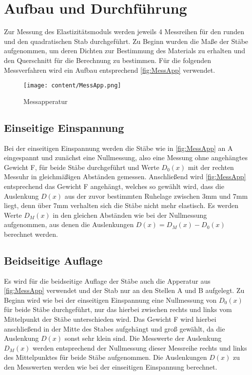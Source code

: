 \section{Aufbau und Durchführung}
\label{sec:Durchführung}
Zur Messung des Elastizitätsmoduls werden jeweils 4 Messreihen für den runden und den quadratischen Stab durchgeführt.
Zu Beginn wurden die Maße der Stäbe aufgenommen, um deren Dichten zur Bestimmung des Materials zu erhalten und den Querschnitt
für die Berechnung zu bestimmen. Für die folgenden Messverfahren wird ein Aufbau entsprechend \autoref{fig:MessApp} verwendet.
\begin{figure}[H]
    \centering
    \texttt{[image: content/MessApp.png]}
    \caption{Messapperatur}
    \label{fig:MessApp}
\end{figure}
\subsection{Einseitige Einspannung}
\label{subsec:EinseitigeEinspannungAuD}
Bei der einseitigen Einspannung werden die Stäbe wie in \autoref{fig:MessApp} an A eingespannt und zunächst eine Nullmessung, also
eine Messung ohne angehängtes Gewicht F, für beide Stäbe durchgeführt und Werte $D_0(x)$ mit der rechten Messuhr in gleichmäßigen Abständen gemessen.
Anschließend wird \autoref{fig:MessApp} entsprechend das Gewicht F angehängt, welches so gewählt wird, dass die Auslenkung $D(x)$
aus der zuvor bestimmten Ruhelage zwischen $3\unit{\milli\meter}$ und $7\unit{\milli\meter}$
liegt, denn über $7\unit{\milli\meter}$ verhalten sich die Stäbe nicht mehr elastisch. Es werden Werte $D_M(x)$ in den gleichen Abständen wie bei der Nullmessung aufgenommen,
aus denen die Auslenkungen $D(x) = D_M(x) - D_0(x)$ berechnet werden.
\subsection{Beidseitige Auflage}
\label{subsec:BeidseitigeAuflage}
Es wird für die beidseitige Auflage der Stäbe auch die Apperatur aus \autoref{fig:MessApp} verwendet und der Stab nur an den Stellen A und B aufgelegt.
Zu Beginn wird wie bei der einseitigen Einspannung eine Nullmessung von $D_0(x)$ für beide Stäbe durchgeführt, nur das hierbei zwischen rechts und links vom
Mittelpunkt der Stäbe unterschieden wird. Das Gewicht F wird hierbei anschließend in der Mitte des Stabes aufgehängt und groß gewählt, da die Auslenkung $D(x)$
sonst sehr klein sind. Die Messwerte der Auslenkung $D_M(x)$ werden entsprechend der Nullmessung dieser Messreihe rechts und links des Mittelpunktes für beide
Stäbe aufgenommen. Die Auslenkungen $D(x)$ zu den Messwerten werden wie bei der einseitigen Einspannung berechnet.
